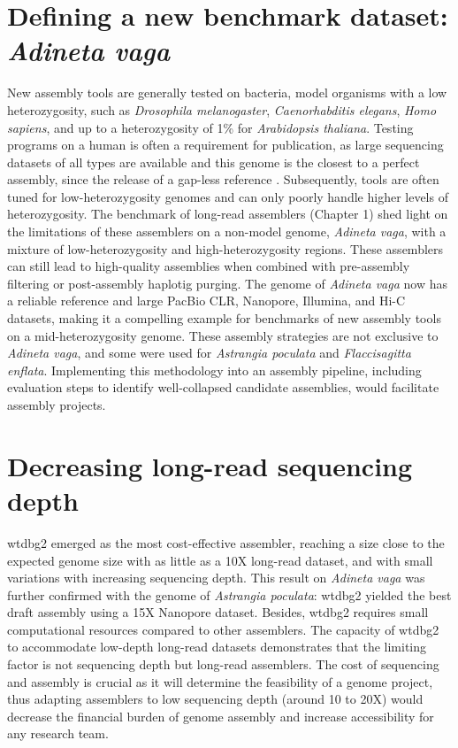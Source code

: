 \section{Defining a new benchmark dataset: \textit{Adineta vaga}}

New assembly tools are generally tested on bacteria, model organisms with a low heterozygosity, such as \textit{Drosophila melanogaster}, \textit{Caenorhabditis elegans}, \textit{Homo sapiens}, and up to a heterozygosity of 1\% for \textit{Arabidopsis thaliana}. Testing programs on a human is often a requirement for publication, as large sequencing datasets of all types are available and this genome is the closest to a perfect assembly, since the release of a gap-less reference \cite{complete_human}. Subsequently, tools are often tuned for low-heterozygosity genomes and can only poorly handle higher levels of heterozygosity. The benchmark of long-read assemblers (Chapter 1) shed light on the limitations of these assemblers on a non-model genome, \textit{Adineta vaga}, with a mixture of low-heterozygosity and high-heterozygosity regions. These assemblers can still lead to high-quality assemblies when combined with pre-assembly filtering or post-assembly haplotig purging. The genome of \textit{Adineta vaga} now has a reliable reference and large PacBio CLR, Nanopore, Illumina, and Hi-C datasets, making it a compelling example for benchmarks of new assembly tools on a mid-heterozygosity genome.  These assembly strategies are not exclusive to \textit{Adineta vaga}, and some were used for \textit{Astrangia poculata} and \textit{Flaccisagitta enflata}. Implementing this methodology into an assembly pipeline, including evaluation steps to identify well-collapsed candidate assemblies, would facilitate assembly projects. \\

\section{Decreasing long-read sequencing depth}

wtdbg2 emerged as the most cost-effective assembler, reaching a size close to the expected genome size with as little as a 10X long-read dataset, and with small variations with increasing sequencing depth. This result on \textit{Adineta vaga} was further confirmed with the genome of \textit{Astrangia poculata}: wtdbg2 yielded the best draft assembly using a 15X Nanopore dataset. Besides, wtdbg2 requires small computational resources compared to other assemblers. The capacity of wtdbg2 to accommodate low-depth long-read datasets demonstrates that the limiting factor is not sequencing depth but long-read assemblers. The cost of sequencing and assembly is crucial as it will determine the feasibility of a genome project, thus adapting assemblers to low sequencing depth (around 10 to 20X) would decrease the financial burden of genome assembly and increase accessibility for any research team. \\

